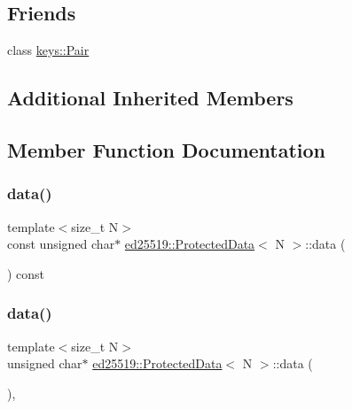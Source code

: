 \subsection*{Friends}
\begin{DoxyCompactItemize}
\item 
class \mbox{\hyperlink{classed25519_1_1_protected_data_ad89670fe663c8c8526b69b1bc6a87c19}{keys\+::\+Pair}}
\end{DoxyCompactItemize}
\subsection*{Additional Inherited Members}


\subsection{Member Function Documentation}
\mbox{\label{classed25519_1_1_protected_data_a4b550b14851e4553fff55e04bf052adf}} 
\subsubsection{\texorpdfstring{data()}{data()}\hspace{0.1cm}{\footnotesize\ttfamily [1/2]}}
{\footnotesize\ttfamily template$<$size\+\_\+t N$>$ \\
const unsigned char$\ast$ \mbox{\hyperlink{classed25519_1_1_protected_data}{ed25519\+::\+Protected\+Data}}$<$ N $>$\+::data (\begin{DoxyParamCaption}{ }\end{DoxyParamCaption}) const\hspace{0.3cm}{\ttfamily [inline]}}

\mbox{\label{classed25519_1_1_protected_data_a4d95663d6cd6b4ec30c6d0969ca896e9}} 
\subsubsection{\texorpdfstring{data()}{data()}\hspace{0.1cm}{\footnotesize\ttfamily [2/2]}}
{\footnotesize\ttfamily template$<$size\+\_\+t N$>$ \\
unsigned char$\ast$ \mbox{\hyperlink{classed25519_1_1_protected_data}{ed25519\+::\+Protected\+Data}}$<$ N $>$\+::data (\begin{DoxyParamCaption}{ }\end{DoxyParamCaption})\hspace{0.3cm}{\ttfamily [inline]}, {\ttfamily [protected]}}


